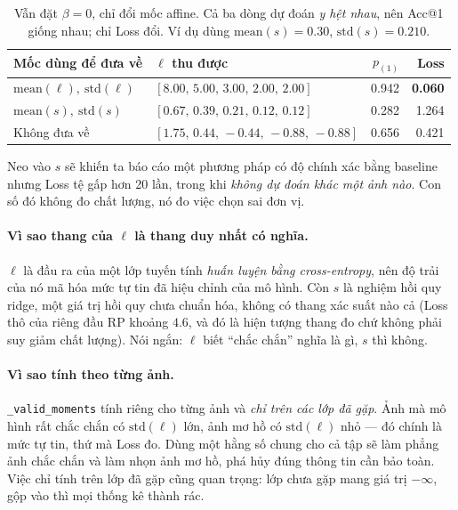 \documentclass[11pt,a4paper]{article}
\begin{document}
\begin{table}[htbp]
\centering
\caption{Vẫn đặt $\beta = 0$, chỉ đổi mốc affine. Cả ba dòng dự đoán \emph{y hệt
nhau}, nên Acc@1 giống nhau; chỉ Loss đổi. Ví dụ dùng
$\mathrm{mean}(s) = 0.30$, $\mathrm{std}(s) = 0.210$.}
\label{tab:moc-affine}
\begin{tabular}{@{}lp{5.0cm}rr@{}}
\toprule
Mốc dùng để đưa về & $\hat\ell$ thu được & $p_{(1)}$ & Loss \\
\midrule
$\mathrm{mean}(\ell),\ \mathrm{std}(\ell)$
  & $[8.00,\, 5.00,\, 3.00,\, 2.00,\, 2.00]$ & 0.942 & \textbf{0.060} \\
$\mathrm{mean}(s),\ \mathrm{std}(s)$
  & $[0.67,\, 0.39,\, 0.21,\, 0.12,\, 0.12]$ & 0.282 & 1.264 \\
Không đưa về
  & $[1.75,\, 0.44,\, -0.44,\, -0.88,\, -0.88]$ & 0.656 & 0.421 \\
\bottomrule
\end{tabular}
\end{table}

Neo vào $s$ sẽ khiến ta báo cáo một phương pháp có độ chính xác bằng baseline
nhưng Loss tệ gấp hơn 20 lần, trong khi \emph{không dự đoán khác một ảnh nào}.
Con số đó không đo chất lượng, nó đo việc chọn sai đơn vị.

\paragraph{Vì sao thang của $\ell$ là thang duy nhất có nghĩa.}
$\ell$ là đầu ra của một lớp tuyến tính \emph{huấn luyện bằng cross-entropy}, nên
độ trải của nó mã hóa mức tự tin đã hiệu chỉnh của mô hình. Còn $s$ là nghiệm hồi
quy ridge, một giá trị hồi quy chưa chuẩn hóa, không có thang xác suất nào cả
(Loss thô của riêng đầu RP khoảng $4.6$, và đó là hiện tượng thang đo chứ không
phải suy giảm chất lượng). Nói ngắn: $\ell$ biết ``chắc chắn'' nghĩa là gì, $s$
thì không.

\paragraph{Vì sao tính theo từng ảnh.}
\texttt{\_valid\_moments} tính riêng cho từng ảnh và \emph{chỉ trên các lớp đã
gặp}. Ảnh mà mô hình rất chắc chắn có $\mathrm{std}(\ell)$ lớn, ảnh mơ hồ có
$\mathrm{std}(\ell)$ nhỏ --- đó chính là mức tự tin, thứ mà Loss đo. Dùng một
hằng số chung cho cả tập sẽ làm phẳng ảnh chắc chắn và làm nhọn ảnh mơ hồ, phá
hủy đúng thông tin cần bảo toàn. Việc chỉ tính trên lớp đã gặp cũng quan trọng:
lớp chưa gặp mang giá trị $-\infty$, gộp vào thì mọi thống kê thành rác.
\end{document}
